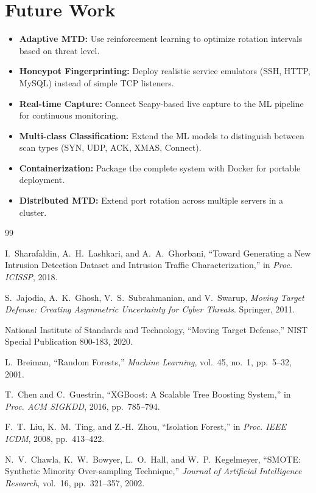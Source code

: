 \documentclass[12pt,a4paper]{report}
\begin{document}
\section{Future Work}

\begin{itemize}
    \item \textbf{Adaptive MTD:} Use reinforcement learning to optimize rotation intervals based on threat level.
    \item \textbf{Honeypot Fingerprinting:} Deploy realistic service emulators (SSH, HTTP, MySQL) instead of simple TCP listeners.
    \item \textbf{Real-time Capture:} Connect Scapy-based live capture to the ML pipeline for continuous monitoring.
    \item \textbf{Multi-class Classification:} Extend the ML models to distinguish between scan types (SYN, UDP, ACK, XMAS, Connect).
    \item \textbf{Containerization:} Package the complete system with Docker for portable deployment.
    \item \textbf{Distributed MTD:} Extend port rotation across multiple servers in a cluster.
\end{itemize}


\begin{thebibliography}{99}

 I.~Sharafaldin, A.~H.~Lashkari, and A.~A.~Ghorbani,
``Toward Generating a New Intrusion Detection Dataset and Intrusion Traffic Characterization,''
in \textit{Proc. ICISSP}, 2018.

 S.~Jajodia, A.~K.~Ghosh, V.~S.~Subrahmanian, and V.~Swarup,
\textit{Moving Target Defense: Creating Asymmetric Uncertainty for Cyber Threats}.
Springer, 2011.

 National Institute of Standards and Technology,
``Moving Target Defense,'' NIST Special Publication 800-183, 2020.

 L.~Breiman,
``Random Forests,''
\textit{Machine Learning}, vol.~45, no.~1, pp.~5--32, 2001.

 T.~Chen and C.~Guestrin,
``XGBoost: A Scalable Tree Boosting System,''
in \textit{Proc. ACM SIGKDD}, 2016, pp.~785--794.

 F.~T.~Liu, K.~M.~Ting, and Z.-H.~Zhou,
``Isolation Forest,''
in \textit{Proc. IEEE ICDM}, 2008, pp.~413--422.

 N.~V.~Chawla, K.~W.~Bowyer, L.~O.~Hall, and W.~P.~Kegelmeyer,
``SMOTE: Synthetic Minority Over-sampling Technique,''
\textit{Journal of Artificial Intelligence Research}, vol.~16, pp.~321--357, 2002.

\end{thebibliography}
\end{document}
